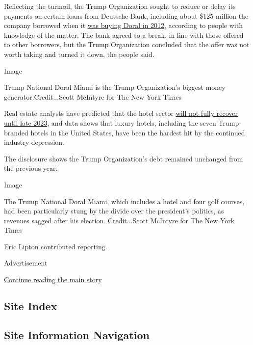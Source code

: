 Reflecting the turmoil, the Trump Organization sought to reduce or delay
its payments on certain loans from Deutsche Bank, including about \$125
million the company borrowed when it
\href{https://www.reuters.com/article/us-usa-florida-trump/trump-buys-miamis-doral-golf-resort-for-150-million-idUSTRE81R1C620120228\#:~:text=MIAMI\%20(Reuters)\%20\%2D\%20Real\%20estate,of\%20hotels\%20and\%20golf\%20resorts.}{was
buying Doral in 2012}, according to people with knowledge of the matter.
The bank agreed to a break, in line with those offered to other
borrowers, but the Trump Organization concluded that the offer was not
worth taking and turned it down, the people said.

Image

Trump National Doral Miami is the Trump Organization's biggest money
generator.Credit...Scott McIntyre for The New York Times

Real estate analysts have predicted that the hotel sector
\href{https://www.cbrehotels.com/en/about-us/press-center/cbre-hotels-research-forecasts-full-demand-recovery-by-late-20220}{will
not fully recover until late 2023}, and data shows that luxury hotels,
including the seven Trump-branded hotels in the United States, have been
the hardest hit by the continued industry depression.

The disclosure shows the Trump Organization's debt remained unchanged
from the previous year.

Image

The Trump National Doral Miami, which includes a hotel and four golf
courses, had been particularly stung by the divide over the president's
politics, as revenues sagged after his election. Credit...Scott McIntyre
for The New York Times

Eric Lipton contributed reporting.

Advertisement

\protect\hyperlink{after-bottom}{Continue reading the main story}

\hypertarget{site-index}{%
\subsection{Site Index}\label{site-index}}

\hypertarget{site-information-navigation}{%
\subsection{Site Information
Navigation}\label{site-information-navigation}}


